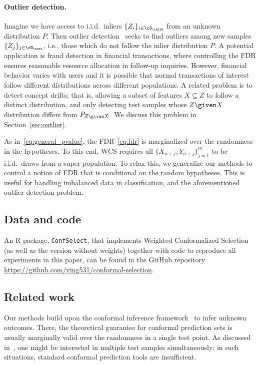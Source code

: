 \paragraph{Outlier detection.} Imagine we have access to i.i.d.~inliers $\{Z_i\}_{i\in \cD_\calib}$
from an unknown distribution $P$. Then outlier detection~\cite{bates2021testing}
seeks to find outliers among new samples $\{Z_j\}_{j\in \cD_\test}$, i.e., those which
do not follow the inlier distribution $P$.
A potential application is fraud detection in financial transactions,
where controlling the FDR ensures reasonable resource allocation
in follow-up inquiries.
However,  financial behavior varies with users and it is possible that normal transactions of interest follow different distributions across different populations.
A related problem is to detect
concept drifts; that is, allowing a subset of features $X\subseteq Z$
to follow a distinct distribution, and only detecting test samples
whose $Z\given X$ distribution differs from $P_{Z\given X}$. We discuss this problem in Section~\ref{sec:outlier}.

As in~\eqref{eq:general_pvalue},
the FDR~\eqref{eq:fdr} is marginalized over the randomness in the hypotheses.
To this end, WCS requires  all
$\{X_{n+j},Y_{n+j}\}_{j=1}^m$ to be i.i.d.~draws from a super-population.
To relax this, we  generalize our methods to
control a notion of FDR that is conditional on the random hypotheses.
This is useful for handling imbalanced data in classification, and
the aforementioned outlier detection problem.


\subsection{Data and code}

An R package, \texttt{ConfSelect}, that implements Weighted Conformalized Selection (as well as the version without weights) together with code to reproduce all experiments in this paper, can be found in the GitHub repository \href{https://github.com/ying531/conformal-selection}{https://github.com/ying531/conformal-selection}.

\subsection{Related work}

Our methods build upon the conformal inference framework~\cite{vovk2005algorithmic} {to infer unknown outcomes}. There,
the theoretical guarantee for conformal prediction sets
is usually marginally valid over the randomness in
a single test point.
As discussed in~\cite{jin2022selection},
one might be interested in multiple test samples
simultaneously; in such situations, standard conformal prediction tools
are insufficient.

